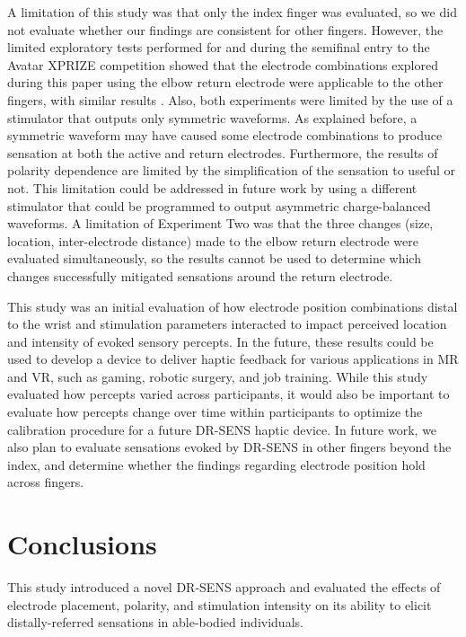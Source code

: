 \documentclass[10pt]{iopart}
\begin{document}
A limitation of this study was that only the index finger was evaluated, so we did not evaluate whether our findings are consistent for other fingers. However, the limited exploratory tests performed for and during the semifinal entry to the Avatar XPRIZE competition showed that the electrode combinations explored during this paper using the elbow return electrode were applicable to the other fingers, with similar results \cite{zhangoperator}. Also, both experiments were limited by the use of a stimulator that outputs only symmetric waveforms. As explained before, a symmetric waveform may have caused some electrode combinations to produce sensation at both the active and return electrodes. Furthermore, the results of polarity dependence are limited by the simplification of the sensation to useful or not. This limitation could be addressed in future work by using a different stimulator that could be programmed to output asymmetric charge-balanced waveforms. A limitation of Experiment Two was that the three changes (size, location, inter-electrode distance) made to the elbow return electrode were evaluated simultaneously, so the results cannot be used to determine which changes successfully mitigated sensations around the return electrode.  

This study was an initial evaluation of how electrode position combinations distal to the wrist and stimulation parameters interacted to impact perceived location and intensity of evoked sensory percepts. In the future, these results could be used to develop a device to deliver haptic feedback for various applications in MR and VR, such as gaming, robotic surgery, and job training. While this study evaluated how percepts varied across participants, it would also be important to evaluate how percepts change over time within participants to optimize the calibration procedure for a future DR-SENS haptic device. In future work, we also plan to evaluate sensations evoked by DR-SENS in other fingers beyond the index, and determine whether the findings regarding electrode position hold across fingers.  

\section{Conclusions}

This study introduced a novel DR-SENS approach and evaluated the effects of electrode placement, polarity, and stimulation intensity on its ability to elicit distally-referred sensations in able-bodied individuals.  
\end{document}
